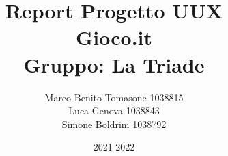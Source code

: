 \documentclass[12pt, a4paper]{report}
\begin{document}
\title{Report Progetto UUX\\
Gioco.it\\
Gruppo: La Triade\\
}
\author{Marco Benito Tomasone 1038815\\
Luca Genova 1038843\\
Simone Boldrini 1038792}
\date{2021-2022}
\maketitle
\tableofcontents












\end{document}
